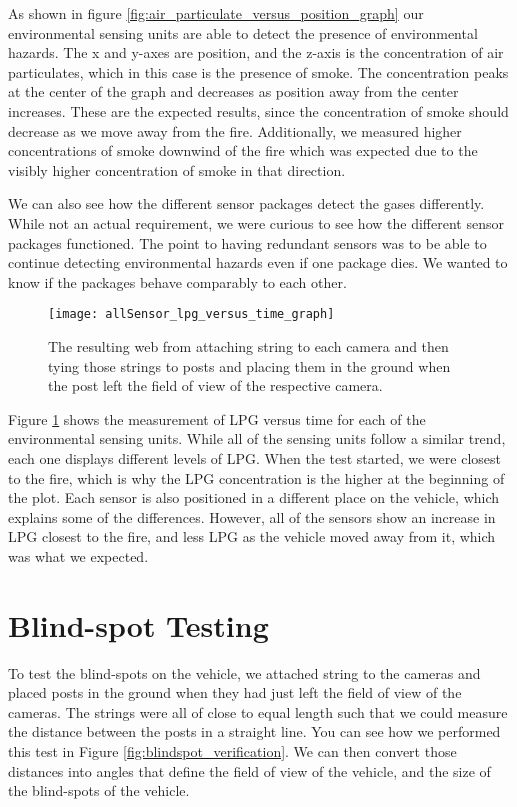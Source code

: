 As shown in figure \ref{fig:air_particulate_versus_position_graph} our environmental sensing units are able to detect the presence of environmental hazards.  The x and y-axes are position, and the z-axis is the concentration of air particulates, which in this case is the presence of smoke.  The concentration peaks at the center of the graph and decreases as position away from the center increases.  These are the expected results, since the concentration of smoke should decrease as we move away from the fire. Additionally, we measured higher concentrations of smoke downwind of the fire which was expected due to the visibly higher concentration of smoke in that direction.

We can also see how the different sensor packages detect the gases differently.  While not an actual requirement, we were curious to see how the different sensor packages functioned.  The point to having redundant sensors was to be able to continue detecting environmental hazards even if one package dies.  We wanted to know if the packages behave comparably to each other.


\begin{figure}[H]
\centerline{\texttt{[image: allSensor\_lpg\_versus\_time\_graph]}}
\caption[]{The resulting web from attaching string to each camera and then tying those strings to posts and placing them in the ground when the post left the field of view of the respective camera.}
\label{fig:allSensor_lpg_versus_time_graph}
\end{figure}

Figure \ref{fig:allSensor_lpg_versus_time_graph} shows the measurement of LPG versus time for each of the environmental sensing units.  While all of the sensing units follow a similar trend, each one displays different levels of LPG.  When the test started, we were closest to the fire, which is why the LPG concentration is the higher at the beginning of the plot.  Each sensor is also positioned in a different place on the vehicle, which explains some of the differences.  However, all of the sensors show an increase in LPG closest to the fire, and less LPG as the vehicle moved away from it, which was what we expected.

\section{Blind-spot Testing}
To test the blind-spots on the vehicle, we attached string to the cameras and placed posts in the ground when they had just left the field of view of the cameras.  The strings were all of close to equal length such that we could measure the distance between the posts in a straight line. You can see how we performed this test in Figure \ref{fig:blindspot_verification}. We can then convert those distances into angles that define the field of view of the vehicle, and the size of the blind-spots of the vehicle. 


